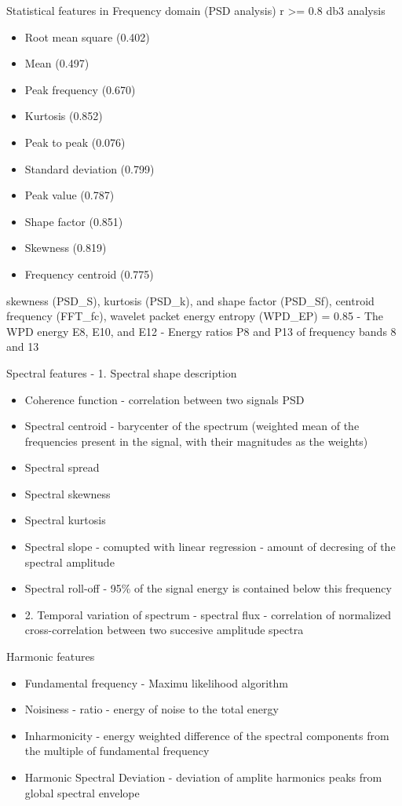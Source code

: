 Statistical features in Frequency domain (PSD analysis) r >= 0.8 db3 analysis
\begin{itemize}
	\item 	Root mean square (0.402)
	\item Mean (0.497)
	\item Peak frequency (0.670)
	\item Kurtosis (0.852)
	\item Peak to peak (0.076)
	\item Standard deviation (0.799)
	\item Peak value (0.787)
	\item Shape factor (0.851)
	\item Skewness (0.819)
	\item Frequency centroid (0.775)
\end{itemize}
skewness (PSD\_S), kurtosis (PSD\_k), and shape factor (PSD\_Sf),
centroid frequency (FFT\_fc), wavelet packet energy entropy (WPD\_EP) = 0.85
- The WPD energy E8, E10, and E12
- Energy ratios P8 and P13 of frequency bands 8 and 13

Spectral features \cite{peeters_large_2004} - 1. Spectral shape description
\begin{itemize}
\item Coherence function - correlation between two signals PSD
\item  Spectral centroid - barycenter of the spectrum (weighted mean of the frequencies present in the signal, with their magnitudes as the weights)
\item Spectral spread
\item Spectral skewness
\item Spectral kurtosis
\item Spectral slope - comupted with linear regression - amount of decresing of the spectral amplitude
\item Spectral roll-off - 95\% of the signal energy is contained below this frequency
\item 2. Temporal variation of spectrum - spectral flux - correlation of normalized cross-correlation between two succesive amplitude spectra
\end{itemize}

Harmonic features
\begin{itemize}
\item Fundamental frequency  - Maximu likelihood algorithm
\item Noisiness - ratio - energy of noise to the total energy
\item Inharmonicity - energy weighted difference of the spectral components from the multiple of fundamental frequency
\item Harmonic Spectral Deviation - deviation of amplite harmonics peaks from global spectral envelope
\end{itemize}

